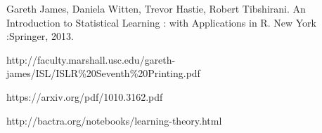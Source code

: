 \documentclass{article}
\newcommand{\comment}[1]{}
\numberwithin{equation}{section}
\begin{document}
\comment{
- left off: pg 47, video:  Lect3 4b 110613
- 
}


\newpage
\begin{thebibliography}{}
\bibitem[]{}
Gareth James, Daniela Witten, Trevor Hastie, Robert Tibshirani. An Introduction to Statistical Learning : with Applications in R. New York :Springer, 2013.


http://faculty.marshall.usc.edu/gareth-james/ISL/ISLR\%20Seventh\%20Printing.pdf



\bibitem[]{}
https://arxiv.org/pdf/1010.3162.pdf

\bibitem[]{}
http://bactra.org/notebooks/learning-theory.html

\end{thebibliography}
\end{document}
